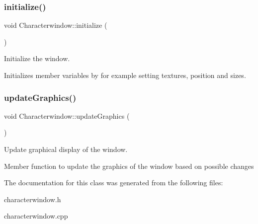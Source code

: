 \subsubsection{\texorpdfstring{initialize()}{initialize()}}
{\footnotesize\ttfamily void Characterwindow\+::initialize (\begin{DoxyParamCaption}{ }\end{DoxyParamCaption})}



Initialize the window. 

Initializes member variables by for example setting textures, position and sizes. \mbox{\label{classCharacterwindow_aaca1dea6e04dbd2843907d652dcf2fb0}} 
\subsubsection{\texorpdfstring{update\+Graphics()}{updateGraphics()}}
{\footnotesize\ttfamily void Characterwindow\+::update\+Graphics (\begin{DoxyParamCaption}{ }\end{DoxyParamCaption})}



Update graphical display of the window. 

Member function to update the graphics of the window based on possible changes 

The documentation for this class was generated from the following files\+:\begin{DoxyCompactItemize}
\item 
characterwindow.\+h\item 
characterwindow.\+cpp\end{DoxyCompactItemize}

